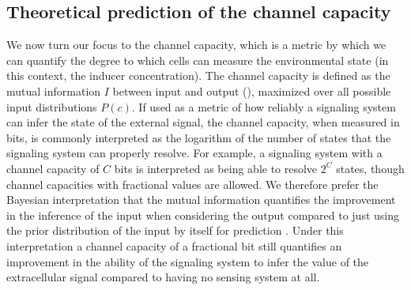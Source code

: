 \subsection{Theoretical prediction of the channel capacity}
\label{sec_channcap}

We now turn our focus to the channel capacity, which is a metric by which we
can quantify the degree to which cells can measure the environmental state (in
this context, the inducer concentration). The channel capacity is defined as
the mutual information $I$ between input and output (),
maximized over all possible input distributions $P(c)$. If used as a metric of
how reliably a signaling system can infer the state of the external signal, the
channel capacity, when measured in bits, is commonly interpreted as the
logarithm of the number of states that the signaling system can properly
resolve. For example, a signaling system with a channel capacity of $C$ bits is
interpreted as being able to resolve $2^C$ states, though channel capacities
with fractional values are allowed. We therefore prefer the Bayesian
interpretation that the mutual information quantifies the improvement in the
inference of the input when considering the output compared to just using the
prior distribution of the input by itself for prediction \cite{Voliotis2014a,
Bowsher2014}. Under this interpretation a channel capacity of a fractional bit
still quantifies an improvement in the ability of the signaling system to infer
the value of the extracellular signal compared to having no sensing system at
all.

